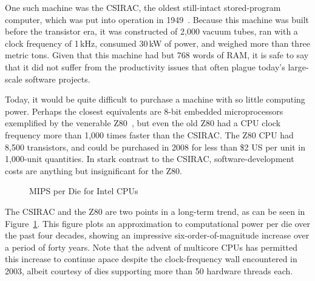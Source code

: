One such machine was the CSIRAC, the oldest still-intact stored-program
computer, which was put into operation in
1949~\cite{CSIRACMuseumVictoria,CSIRACUniversityMelbourne}.
Because this machine was built before the transistor era, it was constructed
of 2,000 vacuum tubes, ran with a clock frequency of 1\,kHz,
consumed 30\,kW of power, and weighed more than three metric tons.
Given that this machine had but 768 words of RAM, it is safe to say that
it did not suffer from the productivity issues that often plague
today's large-scale software projects.

Today, it would be quite difficult to purchase a machine with so
little computing power.
Perhaps the closest equivalents
are 8-bit embedded microprocessors exemplified by the venerable
Z80~\cite{z80Wikipedia}, but even the old Z80 had a CPU clock
frequency more than 1,000 times faster than the CSIRAC\@.
The Z80 CPU had 8,500 transistors, and could be purchased in 2008
for less than \$2 US per unit in 1,000-unit quantities.
In stark contrast to the CSIRAC, software-development costs are
anything but insignificant for the Z80.

\begin{figure}
\centering
{}
\caption{MIPS per Die for Intel CPUs}
\label{fig:intro:MIPS per Die for Intel CPUs}
\end{figure}

The CSIRAC and the Z80 are two points in a long-term trend, as can be
seen in
Figure~\ref{fig:intro:MIPS per Die for Intel CPUs}.
This figure plots an approximation to computational power per die
over the past four decades, showing an impressive six-order-of-magnitude
increase over a period of forty years.
Note that the advent of multicore CPUs has permitted this increase to
continue apace despite the clock-frequency wall encountered in 2003,
albeit courtesy of dies supporting more than 50 hardware threads each.

